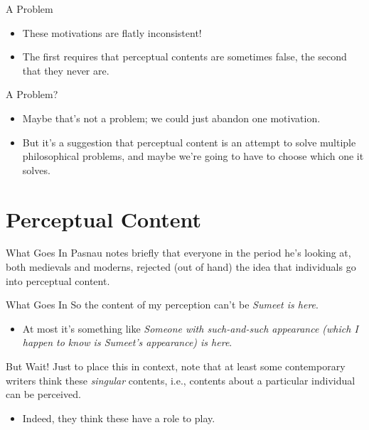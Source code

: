 \documentclass[
  17pt,
  letterpaper,
  ignorenonframetext,
  aspectratio=169,
  handout]{beamer}
\providecommand{\tightlist}{%
  \setlength{\itemsep}{0pt}\setlength{\parskip}{0pt}}\usepackage{longtable,booktabs,array}
\begin{document}
\begin{frame}{A Problem}
\protect\hypertarget{a-problem}{}
\begin{itemize}[<+->]
\tightlist
\item
  These motivations are flatly inconsistent!
\item
  The first requires that perceptual contents are sometimes false, the
  second that they never are.
\end{itemize}
\end{frame}

\begin{frame}{A Problem?}
\protect\hypertarget{a-problem-1}{}
\begin{itemize}[<+->]
\tightlist
\item
  Maybe that's not a problem; we could just abandon one motivation.
\item
  But it's a suggestion that perceptual content is an attempt to solve
  multiple philosophical problems, and maybe we're going to have to
  choose which one it solves.
\end{itemize}
\end{frame}

\hypertarget{perceptual-content}{%
\section{Perceptual Content}\label{perceptual-content}}

\begin{frame}{What Goes In}
\protect\hypertarget{what-goes-in}{}
Pasnau notes briefly that everyone in the period he's looking at, both
medievals and moderns, rejected (out of hand) the idea that individuals
go into perceptual content.
\end{frame}

\begin{frame}{What Goes In}
\protect\hypertarget{what-goes-in-1}{}
So the content of my perception can't be \emph{Sumeet is here}.

\begin{itemize}[<+->]
\tightlist
\item
  At most it's something like \emph{Someone with such-and-such
  appearance (which I happen to know is Sumeet's appearance) is here}.
\end{itemize}
\end{frame}

\begin{frame}{But Wait!}
\protect\hypertarget{but-wait}{}
Just to place this in context, note that at least some contemporary
writers think these \emph{singular} contents, i.e., contents about a
particular individual can be perceived.

\begin{itemize}[<+->]
\tightlist
\item
  Indeed, they think these have a role to play.
\end{itemize}
\end{frame}
\end{document}
